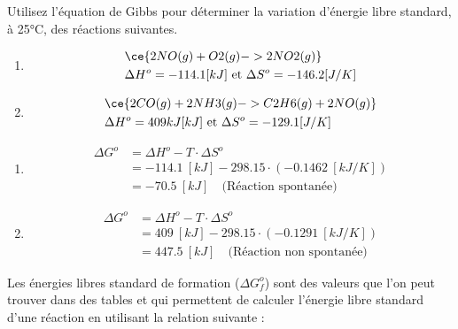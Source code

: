 \documentclass[
  11pt,
  a4paper,
  openany]{book}
\providecommand{\tightlist}{%
  \setlength{\itemsep}{0pt}\setlength{\parskip}{0pt}}
\begin{document}
\begin{Exercise}

Utilisez l'équation de Gibbs pour déterminer la variation d'énergie libre standard, à 25°C, des réactions suivantes.

\begin{enumerate}
\def\labelenumi{\alph{enumi}.}
\tightlist
\item
  \[
  \begin{split}
  & \ce{2 NO(g) + O2(g) -> 2 NO2(g)} \\
  & \Delta H^o = -114.1 [kJ] \text{ et } \Delta S^o = -146.2 [J/K]
  \end{split}
  \]
\item
  \[
  \begin{split}
  & \ce{2 CO(g) + 2 NH3(g) -> C2H6(g) + 2 NO(g)} \\
  & \Delta H^o = 409 kJ [kJ] \text{ et } \Delta S^o = -129.1 [J/K]
  \end{split}
  \]
\end{enumerate}

\end{Exercise}

\begin{Answer}

\begin{enumerate}
\def\labelenumi{\alph{enumi}.}
\tightlist
\item
  \[
  \begin{split}
  \Delta G^o &= \Delta H^o - T \cdot \Delta S^o \\
  &= -114.1\ [kJ] - 298.15 \cdot (-0.1462\ [kJ/K]) \\
  &= -70.5\ [kJ] \quad \text{(Réaction spontanée)}
  \end{split}
  \]
\item
  \[
  \begin{split}
  \Delta G^o &= \Delta H^o - T \cdot \Delta S^o \\
  &= 409\ [kJ] - 298.15 \cdot (-0.1291\ [kJ/K]) \\
  &= 447.5\ [kJ] \quad \text{(Réaction non spontanée)}
  \end{split}
  \]
\end{enumerate}

\end{Answer}

\clearpage

Les énergies libres standard de formation (\(\Delta G^o_f\)) sont des valeurs que l'on peut trouver dans des tables et qui permettent de calculer l'énergie libre standard d'une réaction en utilisant la relation suivante :
\end{document}
